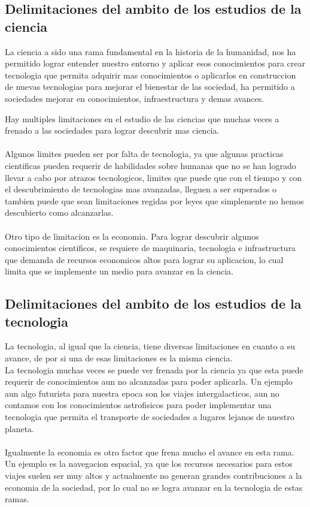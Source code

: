 \subsection{Delimitaciones del ambito de los estudios de la ciencia}

La ciencia a sido una rama fundamental en la historia de la humanidad, nos ha permitido lograr entender nuestro entorno y aplicar esos conocimientos para crear tecnologia que permita adquirir mas conocimientos o aplicarlos en construccion de nuevas tecnologias para mejorar el bienestar de las sociedad, ha permitido a sociedades mejorar en conocimientos, infraestructura y demas avances.

Hay multiples limitaciones en el estudio de las ciencias que muchas veces a frenado a las sociedades para lograr descubrir mas ciencia. 
\\
\\
Algunos limites pueden ser por falta de tecnologia, ya que algunas practicas cientificas pueden requerir de habilidades sobre humanas que no se han logrado llevar a cabo por atrazos tecnologicos, limites que puede que con el tiempo y con el descubrimiento de tecnologias mas avanzadas, lleguen a ser superados o tambien puede que sean limitaciones regidas por leyes que simplemente no hemos descubierto como alcanzarlas.
\\
\\
Otro tipo de limitacion es la economia. Para lograr descubrir algunos conocimientos cientificos, se requiere de maquinaria, tecnologia e infrastructura que demanda de recursos economicos altos para lograr su aplicacion, lo cual limita que se implemente un medio para avanzar en la ciencia.\\

\subsection{Delimitaciones del ambito de los estudios de la tecnologia}

La tecnologia, al igual que la ciencia, tiene diversas limitaciones en cuanto a su avance, de por si una de esas limitaciones es la misma ciencia.\\
La tecnologia muchas veces se puede ver frenada por la ciencia ya que esta puede requerir de conocimientos aun no alcanzadas para poder aplicarla. Un ejemplo aun algo futurista para nuestra epoca son los viajes intergalacticos, aun no contamos con los conocimientos astrofisicos para poder implementar una tecnologia que permita el transporte de sociedades a lugares lejanos de nuestro planeta.
\\
\\
Igualmente la economia es otro factor que frena mucho el avance en esta rama. Un ejemplo es la navegacion espacial, ya que los recursos necesarios para estos viajes suelen ser muy altos y actualmente no generan grandes contribuciones a la economia de la sociedad, por lo cual no se logra avanzar en la tecnologia de estas ramas.


